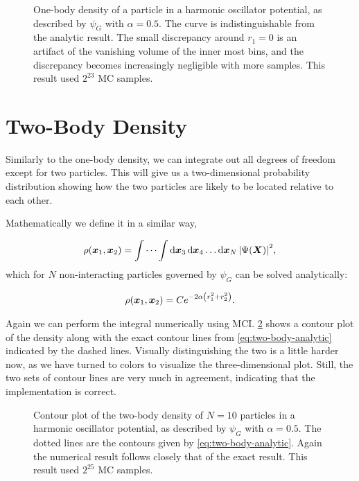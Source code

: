 \documentclass[Thesis.tex]{subfiles}
\begin{document}
\begin{figure}[h]
  \centering
  \resizebox{0.7\linewidth}{!}{%
    
  }
  \caption[One-body density of the ideal harmonic oscillator]{\label{fig:verify-onebody}One-body density of a particle in a
    harmonic oscillator potential, as described by $\psi_G$ with $\alpha=0.5$.
    The curve is indistinguishable from the analytic result. The small
    discrepancy around $r_1=0$ is an artifact of the vanishing volume of the
    inner most bins, and the discrepancy becomes increasingly negligible with
    more samples. This result used $2^{23}$ MC samples.}
\end{figure}

\section{Two-Body Density}

Similarly to the one-body density, we can integrate out all degrees of freedom
except for two particles. This will give us a two-dimensional probability
distribution showing how the two particles are likely to be located relative to
each other.

Mathematically we define it in a similar way,

\begin{align}
  \label{eq:two-body-density-def}
  \rho(\bm{x}_1, \bm{x}_2) = \idotsint \dd{\bm{x}_3}\dd{\bm{x}_4}\dots\dd{\bm{x}_N} \abs{\Psi(\bm{X})}^2,
\end{align}
which for $N$ non-interacting particles governed by $\psi_G$ can be solved
analytically:

\begin{align}
  \label{eq:two-body-analytic}
  \rho(\bm{x}_1, \bm{x}_2) = Ce^{-2\alpha\qty(r_1^2 + r_2^2)}.
\end{align}

Again we can perform the integral numerically using MCI.
\cref{fig:verify-twobody} shows a contour plot of the density along with the
exact contour lines from \cref{eq:two-body-analytic} indicated by the dashed
lines. Visually distinguishing the two is a little harder now, as we have turned
to colors to visualize the three-dimensional plot. Still, the two sets of
contour lines are very much in agreement, indicating that the implementation is
correct.

\begin{figure}[h]
  \centering
  \resizebox{0.7\linewidth}{!}{%
    
  }
  \caption[Two-body density of the ideal harmonic oscillator]{\label{fig:verify-twobody}Contour plot of the two-body density of
$N=10$ particles in a harmonic oscillator potential, as described by $\psi_G$
with $\alpha=0.5$. The dotted lines are the contours given by
\cref{eq:two-body-analytic}. Again the numerical result follows closely that of
the exact result. This result used $2^{25}$ MC samples.}
\end{figure}
\end{document}
